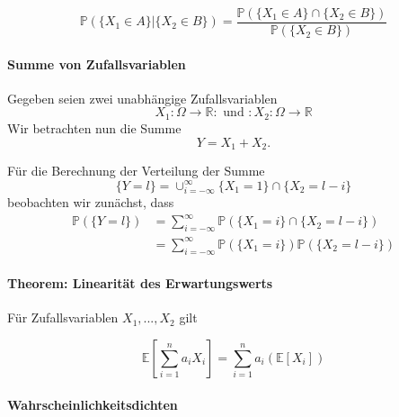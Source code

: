 \begin{equation*}
\mathbb{P} (\{X_{1} \in A \} | \{ X_{2} \in B \} ) = \frac {\mathbb{P} ( \{X_{1} \in A \} \cap \{X_{2} \in B \})} {\mathbb{P} (\{X_{2} \in B\})}
\end{equation*}



\paragraph {Summe von Zufallsvariablen}

Gegeben seien zwei unabhängige Zufallsvariablen
\begin{equation*}
X_{1}:\Omega \rightarrow \mathbb{R} : \text{ und } : X_{2}:\Omega \rightarrow \mathbb{R}
\end{equation*}
Wir betrachten nun die Summe
\begin{equation*}
Y=X_{1}+X_{2}
.\end{equation*}

F\"ur die Berechnung der Verteilung der Summe 
\begin{equation*}
\{Y=l\}=\cup_{i=-\infty}^{\infty} \{X_{1}=1\} \cap \{X_{2}=l-i\}
\end{equation*}
beobachten wir zun\"achst, dass 
\begin{align*}
\mathbb{P} (\{Y=l\}) &= \sum_{i=-\infty}^{\infty} \mathbb{P} (\{X_{1}=i\} \cap \{X_{2}=l-i\})\\
&= \sum_{i=-\infty}^{\infty} \mathbb{P} (\{X_{1} = i\})  \mathbb{P} (\{X_{2}=l-i\})
\end{align*}

\vspace{10pt}

\paragraph {Theorem: Linearit\"at des Erwartungswerts}

\vspace{5pt}

Für Zufallsvariablen ${X_{1},..., X_{2}}$ gilt

\begin{equation*}
\mathbb{E} [\sum_{i=1}^{n} a_{i} X_{i}] = \sum_{i=1}^{n} a_{i} (\mathbb{E} [X_{i}] )
\end{equation*}

\paragraph {Wahrscheinlichkeitsdichten}


